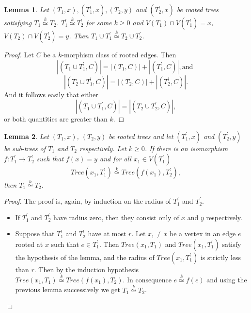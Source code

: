 \documentclass[11pt,notitlepage]{report}
\newtheorem{lemma}{Lemma}[chapter]
\theoremstyle{definition}
\theoremstyle{remark}
\newcommand{\morph}[1]{\stackrel{#1}{\simeq}}
\begin{document}
\begin{lemma}
	Let $(T_1,x),(T^\prime_1,x), (T_2, y)$ and $(T^\prime_2,x)$ 
	be rooted trees satisfying $T_1\morph{k} T_2$.
	$T_1^\prime\morph{k} T_2^\prime$ for some 
	$k\geq 0$ and $V(T_1)\cap V(T_1^\prime)=x$, 
	$V(T_2)\cap V(T_2^\prime)=y$. Then
	$T_1\cup T_1^\prime \morph{k} T_2\cup T_2^\prime$.
\end{lemma}
\begin{proof}
	Let $C$ be a $k$-morphism class of rooted edges. Then
	\[|(T_1\cup T_1^\prime,C)|= |(T_1,C)|+ |(T_1^\prime,C)|, \text{and }\]
	\[|(T_2\cup T_1^\prime,C)|= |(T_2,C)|+ |(T_2^\prime,C)|.\]
	And it follows easily that either
	\[|(T_1\cup T_1^\prime,C)|=|(T_2\cup T_2^\prime,C)|,\]
	or both quantities are greater than $k$. 
\end{proof}


\begin{lemma} 
	Let $(T_1,x)$, $(T_2, y)$ be rooted trees and let 
	$(T^\prime_1,x)$ and $(T^\prime_2,y)$ be sub-trees of 
	$T_1$ and $T_2$ respectively. Let $k\geq 0$.
	If there is an isomorphism 
	$f:T^\prime_1 \rightarrow T^\prime_2$ such that $f(x)=y$ and
	for all $x_1\in V(T^\prime_1)$
	\[ Tree(x_1,T^\prime_1)\morph{k} Tree(f(x_1),T^\prime_2),\]
	then $T_1\morph{k}T_2$. 
\end{lemma}
\begin{proof}
	The proof is, again, by induction on the radius of $T^\prime_1$ and $T^\prime_2$.
	\begin{itemize}
		\item If $T^\prime_1$ and $T^\prime_2$ have radius zero, then they consist only of
		$x$ and $y$ respectively. 
		\item Suppose that $T^\prime_1$ and $T^\prime_2$ have at most $r$. Let $x_1\neq x$ be
		a vertex in an edge $e$ rooted at $x$ such that $e\in T^\prime_1$.
		Then $Tree(x_1, T_1)$ and $Tree(x_1,T^\prime_1)$ satisfy the hypothesis of the lemma,
		and the radius of $Tree(x_1,T^\prime_1)$ is strictly less than $r$. Then by the induction
		hypothesis $Tree(x_1, T_1)\morph{k} Tree(f(x_1),T_2)$. In consequence $e\morph{k}f(e)$
		and using the previous lemma successively we get $T_1\morph{k} T_2$.
	\end{itemize}
\end{proof}
\end{document}
